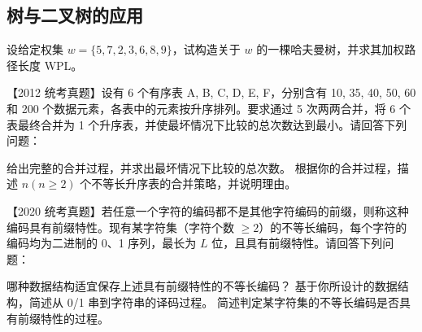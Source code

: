 \subsection{树与二叉树的应用}

\begin{qitems}
    \begin{bbox}
        \qitem 设给定权集 $w = \{5, 7, 2, 3, 6, 8, 9\}$，试构造关于 $w$ 的一棵哈夫曼树，并求其加权路径长度 WPL。
    \end{bbox}

    \begin{bbox}
        \qitem 【2012 统考真题】设有 6 个有序表 A, B, C, D, E, F，分别含有 10, 35, 40, 50, 60 和 200 个数据元素，各表中的元素按升序排列。要求通过 5 次两两合并，将 6 个表最终合并为 1 个升序表，并使最坏情况下比较的总次数达到最小。请回答下列问题：
        \begin{subqitems}
            \subqitem 给出完整的合并过程，并求出最坏情况下比较的总次数。
            \subqitem 根据你的合并过程，描述 $n(n \ge 2)$ 个不等长升序表的合并策略，并说明理由。
        \end{subqitems}
    \end{bbox}

    \begin{bbox}
        \qitem 【2020 统考真题】若任意一个字符的编码都不是其他字符编码的前缀，则称这种编码具有前缀特性。现有某字符集（字符个数 $\ge 2$）的不等长编码，每个字符的编码均为二进制的 0、1 序列，最长为 $L$ 位，且具有前缀特性。请回答下列问题：
        \begin{subqitems}
            \subqitem 哪种数据结构适宜保存上述具有前缀特性的不等长编码？
            \subqitem 基于你所设计的数据结构，简述从 0/1 串到字符串的译码过程。
            \subqitem 简述判定某字符集的不等长编码是否具有前缀特性的过程。
        \end{subqitems}
    \end{bbox}

\end{qitems} 
